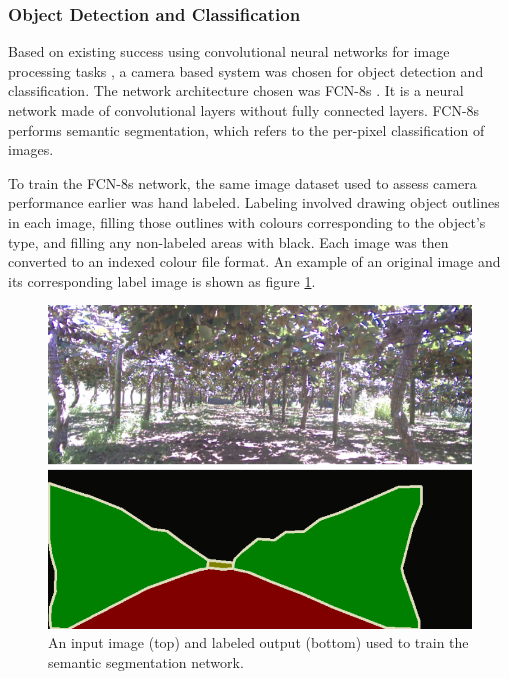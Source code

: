 \documentclass[preprint,authoryear,12pt]{elsarticle}
\begin{document}
    \subsubsection{Object Detection and Classification}

        Based on existing success using convolutional neural networks for image processing tasks \citep{LeCun2015}, a camera based system was chosen for object detection and classification.
    	The network architecture chosen was FCN-8s \citep{long2015}.
        It is a neural network made of convolutional layers without fully connected layers.
    	FCN-8s performs semantic segmentation, which refers to the per-pixel classification of images.

        To train the FCN-8s network, the same image dataset used to assess camera performance earlier was hand labeled.
    	Labeling involved drawing object outlines in each image, filling those outlines with colours corresponding to the object's type, and filling any non-labeled areas with black.
        Each image was then converted to an indexed colour file format.
    	An example of an original image and its corresponding label image is shown as figure \ref{fig:segImgLabelPair}.

        \begin{figure}[htb]
            \centering
            \includegraphics[width=\linewidth]{imgs/photos/segImgLabelPair_trimmed.png}
            \caption{
                An input image (top) and labeled output (bottom) used to train the semantic segmentation network.
            }
            \label{fig:segImgLabelPair}
        \end{figure}
\end{document}
